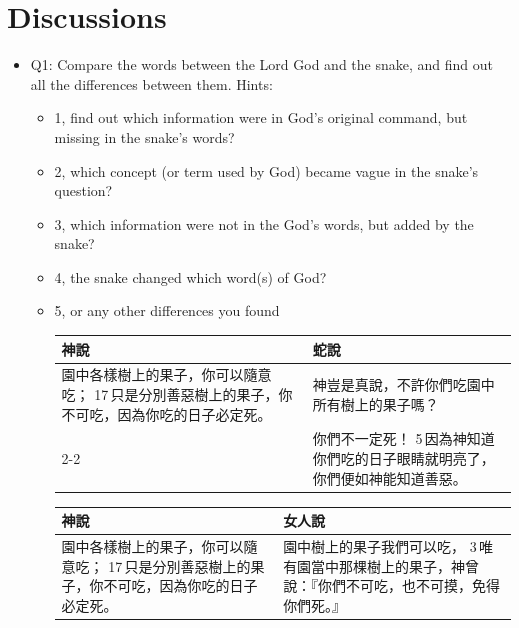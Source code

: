 \section{Discussions}
\normalsize
\begin{itemize}
\item Q1: Compare the words between the Lord God and the snake, and find out all the differences between them. Hints:\\
\begin{itemize}
\item 1, find out which information were in God's original command, but missing in the snake's words?
\item 2, which concept (or term used by God) became vague in the snake's question?
\item 3, which information were not in the God's words, but added by the snake?
\item 4, the snake changed which word(s) of God?
\item 5, or any other differences you found


\begin{table}[H]\centering
\begin{tabular}{p{7.75cm}|p{9.75cm}}\hline\hline
神說&蛇說\\\hline
園中各樣樹上的果子，你可以隨意吃； 17 只是分別善惡樹上的果子，你不可吃，因為你吃的日子必定死。
&神豈是真說，不許你們吃園中所有樹上的果子嗎？
\\\cline{2-2}
&你們不一定死！ 5 因為神知道你們吃的日子眼睛就明亮了，你們便如神能知道善惡。
\\\hline
\end{tabular}
\end{table}
\begin{table}[H]
\centering 
\begin{tabular}{p{}|p{8.5cm}}\hline\hline
神說&女人說\\\hline
園中各樣樹上的果子，你可以隨意吃； 17 只是分別善惡樹上的果子，你不可吃，因為你吃的日子必定死。
&園中樹上的果子我們可以吃， 3 唯有園當中那棵樹上的果子，神曾說：『你們不可吃，也不可摸，免得你們死。』\\\hline
\end{tabular}
\end{table}




\end{itemize}
\end{itemize}
